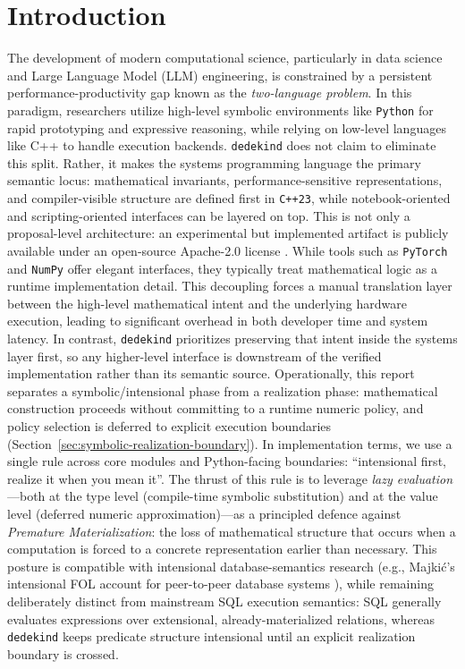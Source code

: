 \documentclass[11pt, a4paper]{report}
\begin{document}
\tableofcontents

\chapter{Introduction}
\label{chap:introduction}

The development of modern computational science, particularly in data science and Large Language Model (LLM) engineering, is constrained by a persistent performance-productivity gap known as the \emph{two-language problem}.
In this paradigm, researchers utilize high-level symbolic environments like \texttt{Python} for rapid prototyping and expressive reasoning, while relying on low-level languages like C++ to handle execution backends.
\texttt{dedekind} does not claim to eliminate this split. Rather, it makes the systems programming language the primary semantic locus: mathematical invariants, performance-sensitive representations, and compiler-visible structure are defined first in \texttt{C++23}, while notebook-oriented and scripting-oriented interfaces can be layered on top.
This is not only a proposal-level architecture: an experimental but implemented artifact is publicly available under an open-source Apache-2.0 license \cite{dedekind2026}.
While tools such as \texttt{PyTorch} \cite{paszke2019pytorch} and \texttt{NumPy} \cite{harris2020numpy} offer elegant interfaces, they typically treat mathematical logic as a runtime implementation detail.
This decoupling forces a manual translation layer between the high-level mathematical intent and the underlying hardware execution, leading to significant overhead in both developer time and system latency. In contrast, \texttt{dedekind} prioritizes preserving that intent inside the systems layer first, so any higher-level interface is downstream of the verified implementation rather than its semantic source.
Operationally, this report separates a symbolic/intensional phase from a realization phase: mathematical construction proceeds without committing to a runtime numeric policy, and policy selection is deferred to explicit execution boundaries (Section~\ref{sec:symbolic-realization-boundary}).
In implementation terms, we use a single rule across core modules and Python-facing boundaries: \enquote{intensional first, realize it when you mean it}.
The thrust of this rule is to leverage \emph{lazy evaluation}---both at the type level (compile-time symbolic substitution) and at the value level (deferred numeric approximation)---as a principled defence against \emph{Premature Materialization}: the loss of mathematical structure that occurs when a computation is forced to a concrete representation earlier than necessary.
This posture is compatible with intensional database-semantics research (e.g.,
Majki\'c's intensional FOL account for peer-to-peer database systems
\cite{majkic2009intensional}), while remaining deliberately distinct from
mainstream SQL execution semantics: SQL generally evaluates expressions over
extensional, already-materialized relations, whereas \texttt{dedekind} keeps
predicate structure intensional until an explicit realization boundary is crossed.
\end{document}
